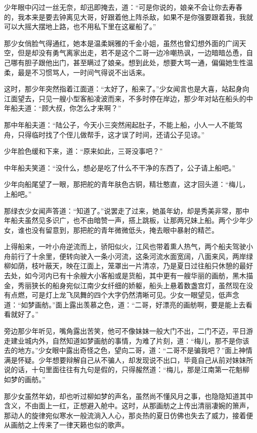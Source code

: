 少年眼中闪过一丝无奈，却迅即掩去，道：“可是你说的，娘亲不会让你去寿春的，我本来是要去钟离见大哥，好跟着他上阵杀敌，如果不是你强要跟着我，我就可以大摇大摆地上路，也不用私下里在这雇船了。”

那少女俏脸气得通红，她本是温柔娴雅的千金小姐，虽然也曾幻想外面的广阔天空，但是却没有勇气离家出走，若不是这个二哥一边冷嘲热讽，一边暗暗怂恿，自己哪有胆子跟他出门，甚至瞒过了娘亲。想到此处，想要大骂一通，偏偏她生性温柔，最是不习惯骂人，一时间气得说不出话来。

这时，那少年突然指着江面道：“太好了，船来了。”少女闻言也是大喜，站起身向江面望去，只见一艘小型客船凌波而来，不多时停在岸边，那少年对站在船头的中年船夫道：“顾大叔，你怎么才来啊？”

那中年船夫道：“陆公子，今天小三突然闹起肚子，不能上船，小人一人不能驾舟，只得临时找了个侄儿做帮手，这才误了时间，还请公子见谅。”

少年脸色缓和下来，道：“原来如此，三哥没事吧？”

中年船夫笑道：“没什么，想必是吃了什么不干净的东西了，公子请上船吧。”

少年向船尾望了一眼，那把舵的青年肤色古铜，精壮憨直，这才回头道：“梅儿，上船吧。”

那绿衣少女闻声答道：“知道了。”说罢走了过来，她虽年幼，却是秀美非常，那中年船夫虽然见多识广，也不由暗赞一声，搭上跳板，让那两兄妹上船。两个少年少女，谁也没有留意到，那把舵的青年微微低头，掩去眼中暴射的精芒。

上得船来，一叶小舟逆流而上，骄阳似火，江风也带着熏人热气，两个船夫驾驶小舟前行了十余里，便转向驶入一条小河流，这条河流水面宽阔，八面来风，两岸绿柳如荫，枝叶蔽天，映在江面上，笼罩出一片清凉，乃是夏日过往船只休憩的最好去处，如今河内已有十余艘大小客船或是货船，其中更有一艘华丽的画舫，黑木描金，秀丽狭长的船身宛似江南少女纤细的娇躯，船头上悬着数盏宫灯，虽然现在没有点燃，可是灯上龙飞凤舞的四个大字仍然清晰可见。少女一眼望见，低声念道：“如梦画舫。”面上露出羡慕之色，道：“二哥，好漂亮的画舫啊，要是能上去看看就好了。”

旁边那少年听见，嘴角露出苦笑，他可不像妹妹一般大门不出，二门不迈，平日游走建业城内外，自然知道如梦画舫的事情，为难了片刻，道：“梅儿，那不是你该去的地方。”少女眼中露出奇怪之色，望向二哥，道：“二哥不是骗我吧？”面上神情满是怀疑。少年想要辩解自己从不骗人，却发现说不出口，毕竟自己从前对妹妹所说的话，十句里面往往有九句是假的，只得赧然道：“梅儿，那是江南第一花魁柳如梦的画舫。”

那少女虽然年幼，却也听过柳如梦的声名，虽然尚不懂风月之事，也隐隐知道其中含义，不由面上一红，正想避入舱中。这时，从那画舫之上传出清丽凄婉的箫声，那动人的旋律宛似寒水一般流淌入人心，那炎热的夏日仿佛也失去了威力，接着便从画舫之上传来了一律天籁也似的歌声。

